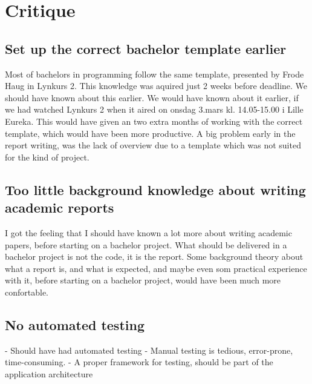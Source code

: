 \chapter{Critique}

\section{Set up the correct bachelor template earlier}

Most of bachelors in programming follow the same template, presented by Frode Haug in Lynkurs 2. This knowledge was aquired just 2 weeks before deadline. We should have known about this earlier. We would have known about it earlier, if we had watched Lynkurs 2 when it aired on onsdag 3.mars kl. 14.05-15.00 i Lille Eureka. This would have given an two extra months of working with the correct template, which would have been more productive. A big problem early in the report writing, was the lack of overview due to a template which was not suited for the kind of project.

\section{Too little background knowledge about writing academic reports}

I got the feeling that I should have known a lot more about writing academic papers, before starting on a bachelor project. What should be delivered in a bachelor project is not the code, it is the report. Some background theory about what a report is, and what is expected, and maybe even som practical experience with it, before starting on a bachelor project, would have been much more confortable.

\section{No automated testing}

- Should have had automated testing
- Manual testing is tedious, error-prone, time-consuming.
- A proper framework for testing, should be part of the application architecture
